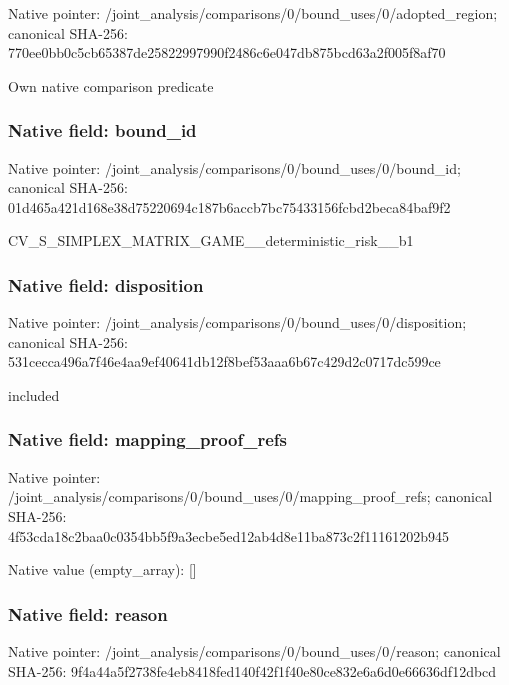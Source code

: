\documentclass[10pt,a4paper]{article}
\begin{document}
Native pointer: /joint\_analysis/comparis\allowbreak{}ons/0/bound\_uses/0/adopt\allowbreak{}ed\_region; canonical SHA-256: 770ee0bb0c5cb65387de2582\allowbreak{}2997990f2486c6e047db875b\allowbreak{}cd63a2f005f8af70


Own native comparison predicate


\subsubsection{Native field: bound\_id}


Native pointer: /joint\_analysis/comparis\allowbreak{}ons/0/bound\_uses/0/bound\allowbreak{}\_id; canonical SHA-256: 01d465a421d168e38d752206\allowbreak{}94c187b6accb7bc75433156f\allowbreak{}cbd2beca84baf9f2


CV\_S\_SIMPLEX\_MATRIX\_GAME\allowbreak{}\_\_deterministic\_risk\_\_b1


\subsubsection{Native field: disposition}


Native pointer: /joint\_analysis/comparis\allowbreak{}ons/0/bound\_uses/0/dispo\allowbreak{}sition; canonical SHA-256: 531cecca496a7f46e4aa9ef4\allowbreak{}0641db12f8bef53aaa6b67c4\allowbreak{}29d2c0717dc599ce


included


\subsubsection{Native field: mapping\_proof\_refs}


Native pointer: /joint\_analysis/comparis\allowbreak{}ons/0/bound\_uses/0/mappi\allowbreak{}ng\_proof\_refs; canonical SHA-256: 4f53cda18c2baa0c0354bb5f\allowbreak{}9a3ecbe5ed12ab4d8e11ba87\allowbreak{}3c2f11161202b945



Native value (empty\_array): []



\subsubsection{Native field: reason}


Native pointer: /joint\_analysis/comparis\allowbreak{}ons/0/bound\_uses/0/reaso\allowbreak{}n; canonical SHA-256: 9f4a44a5f2738fe4eb8418fe\allowbreak{}d140f42f1f40e80ce832e6a6\allowbreak{}d0e66636df12dbcd
\end{document}
